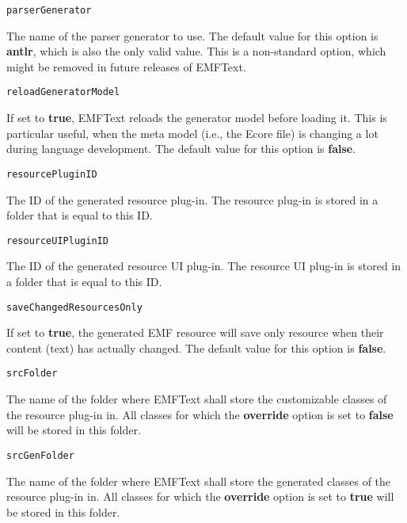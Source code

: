 \noindent\texttt{parserGenerator}
\begin{myindentpar}{1cm}
The name of the parser generator to use. The default value for this option is \textbf{antlr}, which is also the only valid value. This is a non-standard option, which might be removed in future releases of EMFText.
\end{myindentpar}

\noindent\texttt{reloadGeneratorModel}
\begin{myindentpar}{1cm}
If set to \textbf{true}, EMFText reloads the generator model before loading it. This is particular useful, when the meta model (i.e., the Ecore file) is changing a lot during language development. The default value for this option is \textbf{false}.
\end{myindentpar}

\noindent\texttt{resourcePluginID}
\begin{myindentpar}{1cm}
The ID of the generated resource plug-in. The resource plug-in is stored in a folder that is equal to this ID.
\end{myindentpar}

\noindent\texttt{resourceUIPluginID}
\begin{myindentpar}{1cm}
The ID of the generated resource UI plug-in. The resource UI plug-in is stored in a folder that is equal to this ID.
\end{myindentpar}

\noindent\texttt{saveChangedResourcesOnly}
\begin{myindentpar}{1cm}
If set to \textbf{true}, the generated EMF resource will save only resource when their content (text) has actually changed. The default value for this option is \textbf{false}.
\end{myindentpar}

\noindent\texttt{srcFolder}
\begin{myindentpar}{1cm}
The name of the folder where EMFText shall store the customizable classes of the resource plug-in in. All classes for which the \textbf{override} option is set to \textbf{false} will be stored in this folder.
\end{myindentpar}

\noindent\texttt{srcGenFolder}
\begin{myindentpar}{1cm}
The name of the folder where EMFText shall store the generated classes of the resource plug-in in. All classes for which the \textbf{override} option is set to \textbf{true} will be stored in this folder.
\end{myindentpar}

